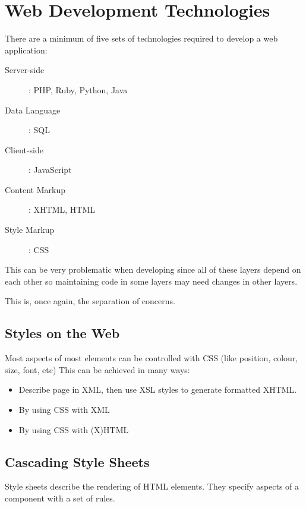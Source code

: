 \section{Web Development Technologies}\label{sec:web_development_technologies}

There are a minimum of five sets of technologies required to develop a web application:

\begin{description}
    \item[Server-side]: PHP, Ruby, Python, Java
    \item[Data Language]: SQL
    \item[Client-side]: JavaScript
    \item[Content Markup]: XHTML, HTML
    \item[Style Markup]: CSS
\end{description}
This can be very problematic when developing since all of these layers depend on each other so maintaining code in some layers may need changes in other layers.

This is, once again, the separation of concerns.

\subsection{Styles on the Web}\label{sub:styles_on_the_web}

Most aspects of most elements can be controlled with CSS (like position, colour, size, font, etc)
This can be achieved in many ways:
\begin{itemize}
    \item Describe page in XML, then use XSL styles to generate formatted XHTML.
    \item By using CSS with XML
    \item By using CSS with (X)HTML
\end{itemize}

\subsection{Cascading Style Sheets}\label{sub:cascading_style_sheets}

Style sheets describe the rendering of HTML elements.
They specify aspects of a component with a set of rules.

